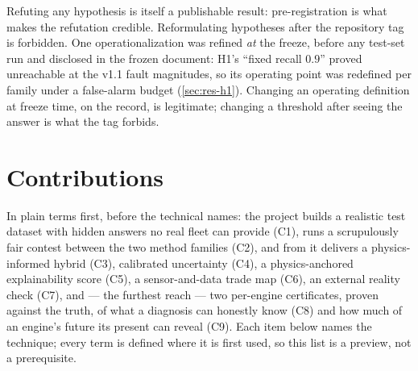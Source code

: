 Refuting any hypothesis is itself a publishable result: pre-registration is what makes the
refutation credible. Reformulating hypotheses after the repository tag  is
forbidden. One operationalization was refined \emph{at} the freeze, before any test-set run
and disclosed in the frozen document: H1's ``fixed recall $0.9$'' proved unreachable at the
v1.1 fault magnitudes, so its operating point was redefined per family under a false-alarm
budget (\cref{sec:res-h1}). Changing an operating definition at freeze time, on the record,
is legitimate; changing a threshold after seeing the answer is what the tag forbids.

\section{Contributions}
\label{sec:contributions}

In plain terms first, before the technical names: the project builds a realistic test dataset
with hidden answers no real fleet can provide (C1), runs a scrupulously fair contest between
the two method families (C2), and from it delivers a physics-informed hybrid (C3), calibrated
uncertainty (C4), a physics-anchored explainability score (C5), a sensor-and-data trade map
(C6), an external reality check (C7), and --- the furthest reach --- two per-engine
certificates, proven against the truth, of what a diagnosis can honestly know (C8) and how
much of an engine's future its present can reveal (C9). Each item below names
the technique; every term is defined where it is first used, so this list is a preview, not a
prerequisite.


